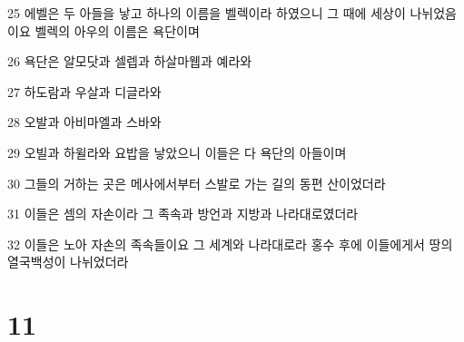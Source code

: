 \par 25 에벨은 두 아들을 낳고 하나의 이름을 벨렉이라 하였으니 그 때에 세상이 나뉘었음이요 벨렉의 아우의 이름은 욕단이며
\par 26 욕단은 알모닷과 셀렙과 하살마웹과 예라와
\par 27 하도람과 우살과 디글라와
\par 28 오발과 아비마엘과 스바와
\par 29 오빌과 하윌라와 요밥을 낳았으니 이들은 다 욕단의 아들이며
\par 30 그들의 거하는 곳은 메사에서부터 스발로 가는 길의 동편 산이었더라
\par 31 이들은 셈의 자손이라 그 족속과 방언과 지방과 나라대로였더라
\par 32 이들은 노아 자손의 족속들이요 그 세계와 나라대로라 홍수 후에 이들에게서 땅의 열국백성이 나뉘었더라

\chapter{11}

